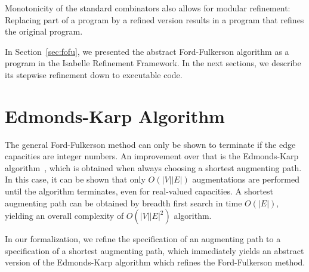\documentclass{llncs}
\begin{document}
Monotonicity of the standard combinators also allows for modular refinement: Replacing part of a program by a refined version
results in a program that refines the original program.

In Section~\ref{sec:fofu}, we presented the abstract Ford-Fulkerson algorithm as a program in the Isabelle Refinement Framework.
In the next sections, we describe its stepwise refinement down to executable code.


% 
% 
% 
% 
% 
% 
% 
% 
% 
% 




\section{Edmonds-Karp Algorithm}
  The general Ford-Fulkerson method can only be shown to terminate if the edge capacities are integer numbers. 
  An improvement over that is the Edmonds-Karp algorithm~\cite{}, which is obtained when always choosing 
  a shortest augmenting path. In this case, it can be shown that only $O(|V||E|)$ augmentations are performed until the
  algorithm terminates, even for real-valued capacities. A shortest augmenting path can be obtained by breadth first search in time $O(|E|)$,
  yielding an overall complexity of $O(|V||E|^2) $ algorithm.
  
  In our formalization, we refine the specification of an augmenting path to a specification of a shortest augmenting path, which immediately yields 
  an abstract version of the Edmonds-Karp algorithm which refines the Ford-Fulkerson method. 
  
\end{document}
